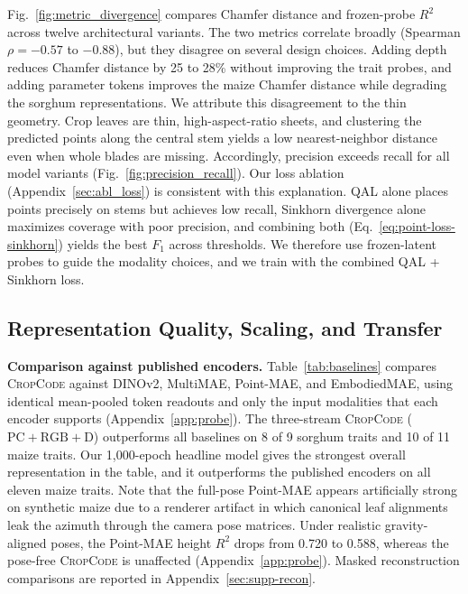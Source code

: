 \documentclass[10pt,twocolumn,letterpaper]{article}
\newcommand{\method}{\textsc{CropCode}}
\begin{document}
Fig.~\ref{fig:metric_divergence} compares Chamfer distance and frozen-probe $R^2$ across twelve architectural variants. The two metrics correlate broadly (Spearman $\rho = -0.57$ to $-0.88$), but they disagree on several design choices. Adding depth reduces Chamfer distance by 25 to 28\% without improving the trait probes, and adding parameter tokens improves the maize Chamfer distance while degrading the sorghum representations. We attribute this disagreement to the thin geometry. Crop leaves are thin, high-aspect-ratio sheets, and clustering the predicted points along the central stem yields a low nearest-neighbor distance even when whole blades are missing. Accordingly, precision exceeds recall for all model variants (Fig.~\ref{fig:precision_recall}). Our loss ablation (Appendix~\ref{sec:abl_loss}) is consistent with this explanation. QAL alone places points precisely on stems but achieves low recall, Sinkhorn divergence alone maximizes coverage with poor precision, and combining both (Eq.~\ref{eq:point-loss-sinkhorn}) yields the best $F_1$ across thresholds. We therefore use frozen-latent probes to guide the modality choices, and we train with the combined QAL + Sinkhorn loss.

\subsection{Representation Quality, Scaling, and Transfer}
\label{sec:res-repr}\label{sec:exp-repr}

\noindent\textbf{Comparison against published encoders.}
Table~\ref{tab:baselines} compares \method{} against DINOv2, MultiMAE, Point-MAE, and EmbodiedMAE, using identical mean-pooled token readouts and only the input modalities that each encoder supports (Appendix~\ref{app:probe}). The three-stream \method{} ($\mathrm{PC}+\mathrm{RGB}+\mathrm{D}$) outperforms all baselines on 8 of 9 sorghum traits and 10 of 11 maize traits. Our 1{,}000-epoch headline model gives the strongest overall representation in the table, and it outperforms the published encoders on all eleven maize traits. Note that the full-pose Point-MAE appears artificially strong on synthetic maize due to a renderer artifact in which canonical leaf alignments leak the azimuth through the camera pose matrices. Under realistic gravity-aligned poses, the Point-MAE height $R^2$ drops from 0.720 to 0.588, whereas the pose-free \method{} is unaffected (Appendix~\ref{app:probe}). Masked reconstruction comparisons are reported in Appendix~\ref{sec:supp-recon}.
\end{document}
